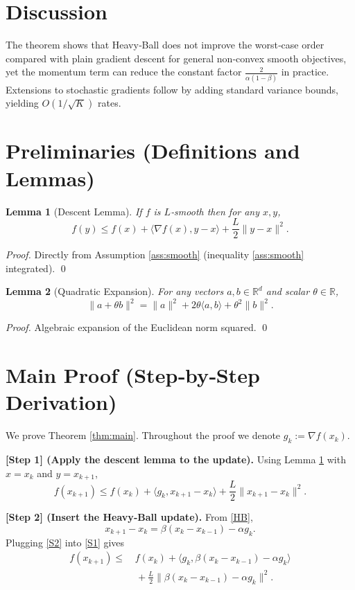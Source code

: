 \documentclass{article}
\newtheorem{lemma}{Lemma}
\begin{document}
\section*{Discussion}
The theorem shows that Heavy‑Ball does not improve the worst‑case order compared with plain gradient descent for general non‑convex smooth objectives, yet the momentum term can reduce the constant factor $\frac{2}{\alpha(1-\beta)}$ in practice. Extensions to stochastic gradients follow by adding standard variance bounds, yielding $O(1/\sqrt{K})$ rates.

\newpage
\section*{Preliminaries (Definitions and Lemmas)}
\begin{lemma}[Descent Lemma]\label{lem:descent}
If $f$ is $L$‑smooth then for any $x,y$,
\[
f(y)\le f(x)+\langle\nabla f(x),y-x\rangle+\frac{L}{2}\|y-x\|^{2}.
\tag{L1}
\]
\end{lemma}
\begin{proof}
Directly from Assumption \ref{ass:smooth} (inequality \eqref{ass:smooth} integrated). \hfill\qed
\end{proof}

\begin{lemma}[Quadratic Expansion]\label{lem:quad}
For any vectors $a,b\in\mathbb{R}^{d}$ and scalar $\theta\in\mathbb{R}$,
\[
\|a+\theta b\|^{2}= \|a\|^{2}+2\theta\langle a,b\rangle+\theta^{2}\|b\|^{2}.
\tag{L2}
\]
\end{lemma}
\begin{proof}
Algebraic expansion of the Euclidean norm squared. \hfill\qed
\end{proof}

\section*{Main Proof (Step‑by‑Step Derivation)}
We prove Theorem \ref{thm:main}. Throughout the proof we denote $g_{k}:=\nabla f(x_{k})$.

\bigskip
\noindent\textbf{[Step 1] (Apply the descent lemma to the update).}  
Using Lemma \ref{lem:descent} with $x=x_{k}$ and $y=x_{k+1}$,
\[
f(x_{k+1})\le f(x_{k})+\langle g_{k},x_{k+1}-x_{k}\rangle+\frac{L}{2}\|x_{k+1}-x_{k}\|^{2}.
\tag{S1}
\]

\noindent\textbf{[Step 2] (Insert the Heavy‑Ball update).}  
From \eqref{HB},
\[
x_{k+1}-x_{k}= \beta (x_{k}-x_{k-1})-\alpha g_{k}.
\tag{S2}
\]
Plugging \eqref{S2} into \eqref{S1} gives
\[
\begin{aligned}
f(x_{k+1})\le &\, f(x_{k}) 
+ \langle g_{k}, \beta (x_{k}-x_{k-1})-\alpha g_{k}\rangle \\
&\;+\frac{L}{2}\|\beta (x_{k}-x_{k-1})-\alpha g_{k}\|^{2}.
\end{aligned}
\tag{S3}
\]
\end{document}
